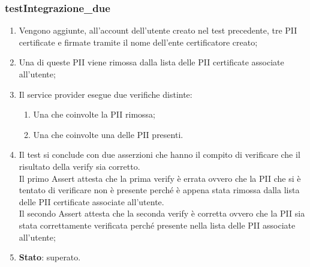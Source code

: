 \subsubsection{testIntegrazione\_due}
\begin{enumerate}
	\item Vengono aggiunte, all'account dell'utente creato nel test precedente, tre \gls{PII} certificate e firmate tramite il nome dell'ente certificatore creato;
	\item Una di queste \gls{PII} viene rimossa dalla lista delle \gls{PII} certificate associate all'utente;
	\item Il service provider esegue due verifiche distinte:
	\begin{enumerate}
		\item Una che coinvolte la \gls{PII} rimossa;
		\item Una che coinvolte una delle \gls{PII} presenti.
	\end{enumerate}
	\item Il test si conclude con due asserzioni che hanno il compito di verificare che il risultato della verify sia corretto.\\
	Il primo Assert attesta che la prima verify è errata ovvero che la \gls{PII} che si è tentato di verificare non è presente perché è appena stata rimossa dalla lista delle \gls{PII} certificate associate all'utente.\\
	Il secondo Assert attesta che la seconda verify è corretta ovvero che la \gls{PII} sia stata correttamente verificata perché presente nella lista delle \gls{PII} associate all'utente;
	\item \textbf{Stato}: superato.
\end{enumerate}
